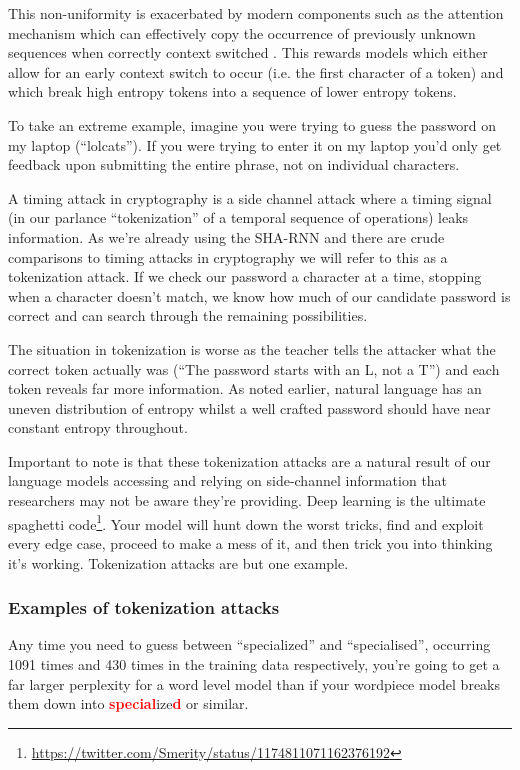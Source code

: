 \documentclass{article}
\begin{document}
This non-uniformity is exacerbated by modern components such as the attention mechanism which can effectively copy the occurrence of previously unknown sequences when correctly context switched \cite{al2019character}.
This rewards models which either allow for an early context switch to occur (i.e. the first character of a token) and which break high entropy tokens into a sequence of lower entropy tokens.

To take an extreme example, imagine you were trying to guess the password on my laptop (``lolcats'').
If you were trying to enter it on my laptop you'd only get feedback upon submitting the entire phrase, not on individual characters.

A timing attack in cryptography is a side channel attack where a timing signal (in our parlance ``tokenization'' of a temporal sequence of operations) leaks information.
As we're already using the SHA-RNN and there are crude comparisons to timing attacks in cryptography we will refer to this as a tokenization attack.
If we check our password a character at a time, stopping when a character doesn't match, we know how much of our candidate password is correct and can search through the remaining possibilities.

The situation in tokenization is worse as the teacher tells the attacker what the correct token actually was (``The password starts with an L, not a T'') and each token reveals far more information.
As noted earlier, natural language has an uneven distribution of entropy whilst a well crafted password should have near constant entropy throughout.

Important to note is that these tokenization attacks are a natural result of our language models accessing and relying on side-channel information that researchers may not be aware they're providing.
Deep learning is the ultimate spaghetti code\footnote{\url{https://twitter.com/Smerity/status/1174811071162376192}}.
Your model will hunt down the worst tricks, find and exploit every edge case, proceed to make a mess of it, and then trick you into thinking it's working.
Tokenization attacks are but one example.

\subsubsection{Examples of tokenization attacks}

Any time you need to guess between ``specialized'' and ``specialised'', occurring 1091 times and 430 times in the training data respectively, you're going to get a far larger perplexity for a word level model than if your wordpiece model breaks them down into 
\textbf{\textcolor{red}{special}}ize\textbf{\textcolor{red}{d}} or similar.
\end{document}
